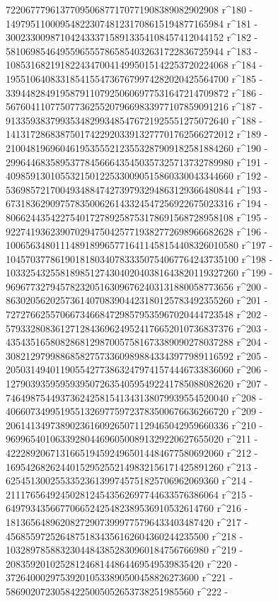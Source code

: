        7220677796137709506877170771908389082902908 r^180 - 
       14979511000954822307481231708615194877165984 r^181 - 
       30023300987104243337158913354108457412044152 r^182 - 
       58106985464955965557865854032631722836725944 r^183 - 
       108531682191822434700414995015142253720224068 r^184 - 
       195510640833185415547367679974282020425564700 r^185 - 
       339448284919587911079250606977531647214709872 r^186 - 
       567604110775077362552079669833977107859091216 r^187 - 
       913359383799353482993485476721925551275072640 r^188 - 
       1413172868387501742292033913277701762566272012 r^189 - 
       2100481969604619535552123553287909182581884260 r^190 - 
       2996446835895377845666435450357325713732789980 r^191 - 
       4098591301055321501225330090515860330043344660 r^192 - 
       5369857217004934884742739793294863129366480844 r^193 - 
       6731836290975783500626143324547256922675023316 r^194 - 
       8066244354227540172789258753178691568728958108 r^195 - 
       9227419362390702947504257719382772698966682628 r^196 - 
       10065634801114891899657716411458154408326010580 r^197 - 
       10457037786190181803407833350754067764243735100 r^198 - 
       10332543255818985127430402040381643820119327260 r^199 - 
       9696773279457823205163096762403131880058773656 r^200 - 
       8630205620257361407083904423180125783492355260 r^201 - 
       7272766255706673466847298579535967020444723548 r^202 - 
       5793328083612712843696249524176652010736837376 r^203 - 
       4354351658082868129870057581673389090278037288 r^204 - 
       3082129799886858275733609898843343977989116592 r^205 - 
       2050314940119055427738632479741574446733836060 r^206 - 
       1279039359595939507263540595492241785088082620 r^207 - 
       746498754493736242581541343138079939554520040 r^208 - 
       406607349951955132697759723783500676636266720 r^209 - 
       206141349738902361609265071129465042959660336 r^210 - 
       96996540106339280446960500891329220627655020 r^211 - 
       42228920671316651945924965014484677580692060 r^212 - 
       16954268262440152952552149832156171425891260 r^213 - 
       6254513002553352361399745751825706962069360 r^214 - 
       2111765649245028124543562697744633576386064 r^215 - 
       649793435667706652425482389536910532614760 r^216 - 
       181365648962082729073999775796433403487420 r^217 - 
       45685597252648751834356162604360244235500 r^218 - 
       10328978588323044843852830960184756766980 r^219 - 
       2083592010252812468144864469549539835420 r^220 - 
       372640002975392010533890500458826273600 r^221 - 
       58690207230584225005052653738251985560 r^222 - 
